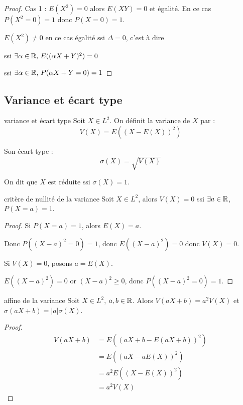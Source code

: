 \begin{proof}
    Cas 1 : $E(X^2) = 0$ alors $E(XY) =0$ et égalité. En ce cas $P(X^2 = 0) = 1$ donc 
    $P(X = 0) = 1$.

     $E(X^2) \neq 0$ en ce cas égalité ssi $\Delta = 0$, c'est à dire
    
    ssi $\exists \alpha \in \mathbb{R}, \, E((\alpha X + Y)^2) = 0$

    ssi $\exists \alpha \in \mathbb{R}, \, P(\alpha X + Y = 0) = 1$
\end{proof}

\subsection{Variance et écart type }

\begin{definition}{variance et écart type}{}
    Soit $X \in L^2$. On définit la variance de $X$ par : 
    $$V(X) = E\left( (X - E(X))^2 \right) $$

    Son écart type : 
    $$ \sigma(X) = \sqrt{V(X)} $$

    On dit que $X$ est réduite ssi $\sigma(X) = 1$. 
\end{definition}

\begin{proposition}{critère de nullité de la variance}{}
    Soit $X \in L^2$, alors $V(X) = 0$ ssi 
    $\exists a \in \mathbb{R}$, $P(X = a) = 1$.
\end{proposition}

\begin{proof}
    Si $P(X = a) = 1$, alors $E(X) = a$.

    Donc $P((X - a)^2 = 0) = 1$, donc $E((X - a)^2) = 0$ donc $V(X) = 0$.

     Si $V(X) = 0$, posons $a = E(X)$.

    $E((X - a)^2) = 0$ or $(X - a)^2 \geqslant 0$, donc $P((X - a)^2 = 0) = 1$.
\end{proof}

\begin{proposition}{affine de la variance}{}
    Soit $X \in L^2$, $a, b \in \mathbb{R}$. Alors $V(a X + b) = a^2 V(X)$ et 
    $\sigma(a X + b) = |a| \sigma(X)$.
\end{proposition}

\begin{proof}
    \begin{align}
        V(a X + b) & = E\left( (a X + b - E(a X + b))^2 \right) \\
        & = E\left( (a X - a E(X))^2 \right) \\
        & = a^2 E\left( (X - E(X))^2 \right) \\
        & = a^2 V(X)        
    \end{align}
\end{proof}

